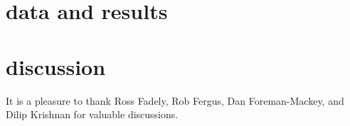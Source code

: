 \documentclass[12pt, preprint]{aastex}
\begin{document}
\section{data and results}

\section{discussion}

\acknowledgements It is a pleasure to thank
  Ross Fadely,
  Rob Fergus,
  Dan Foreman-Mackey, and
  Dilip Krishnan
for valuable discussions.
\end{document}
